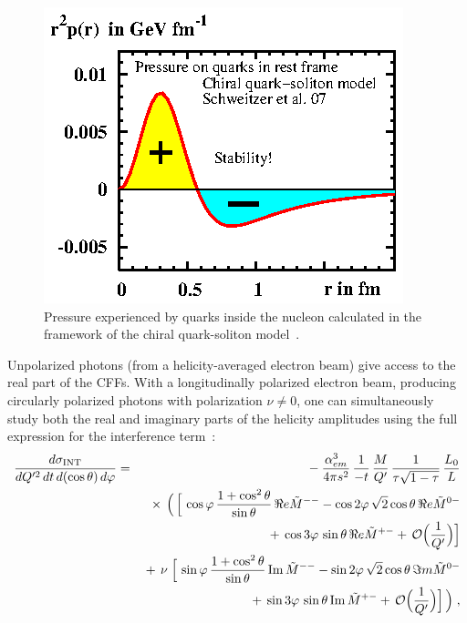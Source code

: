 \begin{figure}[t]
\begin{center}
\includegraphics[scale=1.4]{pressure.eps}
\end{center}
\caption{\small{Pressure experienced by quarks inside the nucleon calculated
in the framework of the chiral quark-soliton model~\cite{Goeke:2007fp}.}}
\label{fig:D_term}
\end{figure}

Unpolarized photons (from a helicity-averaged electron beam) give access
to the real part of the CFFs. With a longitudinally polarized electron beam,
producing circularly polarized photons with polarization $\nu \neq 0$, one
can simultaneously study both the real and imaginary parts of the helicity
amplitudes using the full expression for the interference
term~\cite{Berger:2001xd}:
 \begin{eqnarray}
 \frac{d\sigma_{\rm INT}}{dQ^{\prime 2}\, dt\, d(\cos\theta)\, d\varphi}
&=& {}- \frac{\alpha^3_{em}}{4\pi s^2}\, \frac{1}{-t}\, \frac{M}{Q^{\prime}}\,
 \frac{1}{\tau \sqrt{1-\tau}}\, \frac{L_0}{L}
 \nonumber \\
&& {}\times\, \Big(\,\Big[\, \cos\varphi\, \frac{1+\cos^2\theta}{\sin\theta}\, \Re e\tilde{M}^{--}
   - \cos2\varphi\, \sqrt{2}\cos\theta\, \Re e \tilde{M}^{0-}
 \nonumber \\
&& {}+\, \cos3\varphi\, \sin\theta\, \Re e \tilde{M}^{+-}
   {}+\, {\cal O}\Big( \frac{1}{Q^{\prime}} \Big) \Big]
 \nonumber \\
&& {}+\, \nu\; \Big[\, \sin\varphi\, \frac{1+\cos^2\theta}{\sin\theta}\, \mathrm{Im}\,\tilde{M}^{--}
   - \sin2\varphi\, \sqrt{2}\cos\theta\, \Im m\tilde{M}^{0-}
 \nonumber \\
&& {}+\, \sin3\varphi\, \sin\theta\, \mathrm{Im}\,\tilde{M}^{+-} +\, {\cal O}\Big( \frac{1}{Q^{\prime}} \Big) \Big]\, \Big) \; ,
\label{eq:interference_2}
\end{eqnarray}

